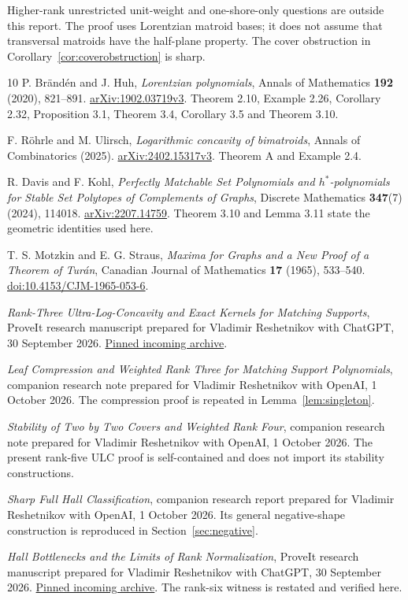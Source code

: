 Higher-rank unrestricted unit-weight and one-shore-only questions are outside this report. The proof uses Lorentzian matroid bases; it does not assume that transversal matroids have the half-plane property. The cover obstruction in Corollary~\ref{cor:coverobstruction} is sharp.

\begin{thebibliography}{10}
\small
\setlength{\itemsep}{2pt}
P. Br\"and\'en and J. Huh, \emph{Lorentzian polynomials}, Annals of Mathematics \textbf{192} (2020), 821--891.
\href{https://arxiv.org/html/1902.03719v3}{arXiv:1902.03719v3}. Theorem 2.10, Example 2.26, Corollary 2.32, Proposition 3.1, Theorem 3.4, Corollary 3.5 and Theorem 3.10.

F. R\"ohrle and M. Ulirsch, \emph{Logarithmic concavity of bimatroids}, Annals of Combinatorics (2025).
\href{https://arxiv.org/html/2402.15317v3}{arXiv:2402.15317v3}. Theorem A and Example 2.4.

R. Davis and F. Kohl, \emph{Perfectly Matchable Set Polynomials and $h^*$-polynomials for Stable Set Polytopes of Complements of Graphs}, Discrete Mathematics \textbf{347}(7) (2024), 114018.
\href{https://arxiv.org/html/2207.14759}{arXiv:2207.14759}. Theorem 3.10 and Lemma 3.11 state the geometric identities used here.

T. S. Motzkin and E. G. Straus, \emph{Maxima for Graphs and a New Proof of a Theorem of Tur\'an}, Canadian Journal of Mathematics \textbf{17} (1965), 533--540.
\href{https://doi.org/10.4153/CJM-1965-053-6}{doi:10.4153/CJM-1965-053-6}.

\emph{Rank-Three Ultra-Log-Concavity and Exact Kernels for Matching Supports}, ProveIt research manuscript prepared for Vladimir Reshetnikov with ChatGPT, 30 September 2026.
\href{https://github.com/VladimirReshetnikov/ProveIt/blob/1b3960d8acdabd983147b7c609bd9dfb2d67a0a0/docs/incoming/ProveIt_Matching_Rank_Research.zip}{Pinned incoming archive}.

\emph{Leaf Compression and Weighted Rank Three for Matching Support Polynomials}, companion research note prepared for Vladimir Reshetnikov with OpenAI, 1 October 2026. The compression proof is repeated in Lemma~\ref{lem:singleton}.

\emph{Stability of Two by Two Covers and Weighted Rank Four}, companion research note prepared for Vladimir Reshetnikov with OpenAI, 1 October 2026. The present rank-five ULC proof is self-contained and does not import its stability constructions.

\emph{Sharp Full Hall Classification}, companion research report prepared for Vladimir Reshetnikov with OpenAI, 1 October 2026. Its general negative-shape construction is reproduced in Section~\ref{sec:negative}.

\emph{Hall Bottlenecks and the Limits of Rank Normalization}, ProveIt research manuscript prepared for Vladimir Reshetnikov with ChatGPT, 30 September 2026.
\href{https://github.com/VladimirReshetnikov/ProveIt/blob/a866ff9a2/docs/incoming/ProveIt_Hall_Bottlenecks.zip}{Pinned incoming archive}. The rank-six witness is restated and verified here.
\end{thebibliography}
